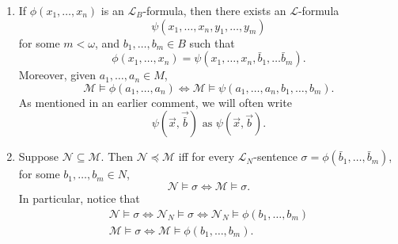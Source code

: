 \documentclass[notoc,notitlepage]{tufte-book}
\begin{document}
\begin{remark}
  \begin{enumerate}
    \item If $\phi(x_1, \ldots, x_n)$ is an $\mathcal{L}_B$-formula, then there exists an $\mathcal{L}$-formula
      \begin{equation*}
        \psi(x_1, \ldots, x_n, y_1, \ldots, y_m)
      \end{equation*}
      for some $m < \omega$, and $b_1, \ldots, b_m \in B$ such that
      \begin{equation*}
        \phi(x_1, \ldots, x_n) = \psi(x_1, \ldots, x_n, \bar{b}_1, \ldots \bar{b}_m).
      \end{equation*}
      Moreover, given $a_1, \ldots, a_n \in M$,
      \begin{equation*}
        \mathcal{M} \models \phi(a_1, \ldots, a_n) \iff \mathcal{M} \models \psi(a_1, \ldots, a_n, b_1, \ldots, b_m).
      \end{equation*}
      As mentioned in an earlier comment, we will often write
      \begin{equation*}
        \psi(\vec{x}, \vec{\bar{b}}) \text{ as } \psi(\vec{x}, \vec{b}).
      \end{equation*}

    \item Suppose $\mathcal{N} \subseteq \mathcal{M}$. Then $\mathcal{N} \preceq \mathcal{M}$ iff for every $\mathcal{L}_N$-sentence $\sigma = \phi(\bar{b}_1, \ldots, \bar{b}_m)$, for some $b_1, \ldots, b_m \in N$,
      \begin{equation*}
        \mathcal{N} \models \sigma \iff \mathcal{M} \models \sigma.
      \end{equation*}
      In particular, notice that
      \begin{gather*}
        \mathcal{N} \models \sigma \iff \mathcal{N}_N \models \sigma \iff \mathcal{N}_N \models \phi(b_1, \ldots, b_m) \\
          \mathcal{M} \models \sigma \iff \mathcal{M} \models \phi(b_1, \ldots, b_m).
      \end{gather*}
  \end{enumerate}
\end{remark}
\end{document}
